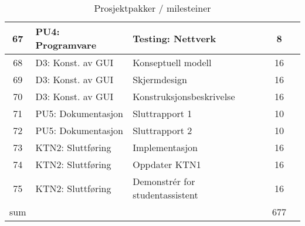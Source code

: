 \begin{table}
{\begin{tabularx}{1.3\textwidth}{|c|l|X|c|c|}
	67 & PU4: Programvare & Testing: Nettverk & 8 & \\ \hline
	68 & D3: Konst. av GUI & Konseptuell modell & 16 & \\ \hline
	69 & D3: Konst. av GUI & Skjermdesign & 16 & \\ \hline
	70 & D3: Konst. av GUI & Konstruksjonsbeskrivelse & 16 & \\ \hline
	71 & PU5: Dokumentasjon & Sluttrapport  1& 10 & \\ \hline
	72 & PU5: Dokumentasjon & Sluttrapport  2& 10 & \\ \hline
	73 & KTN2: Sluttføring & Implementasjon & 16 & \\ \hline
	74 & KTN2: Sluttføring & Oppdater KTN1 & 16 & \\ \hline
	75 & KTN2: Sluttføring & Demonstrér for studentassistent & 16 & \\ \hline
	sum & & & 677 & \\ \hline \hline
	\end{tabularx}}
\caption {Prosjektpakker / milesteiner}
\end{table}

